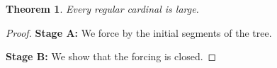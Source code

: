 \documentclass{article}
\newtheorem{theorem}{Theorem}
\begin{document}
\begin{theorem} Every regular cardinal is large. \end{theorem}
\begin{proof}
\textbf{Stage A:} We force by the initial segments of the tree.

\textbf{Stage B:} We show that the forcing is closed.
\end{proof}
\end{document}
